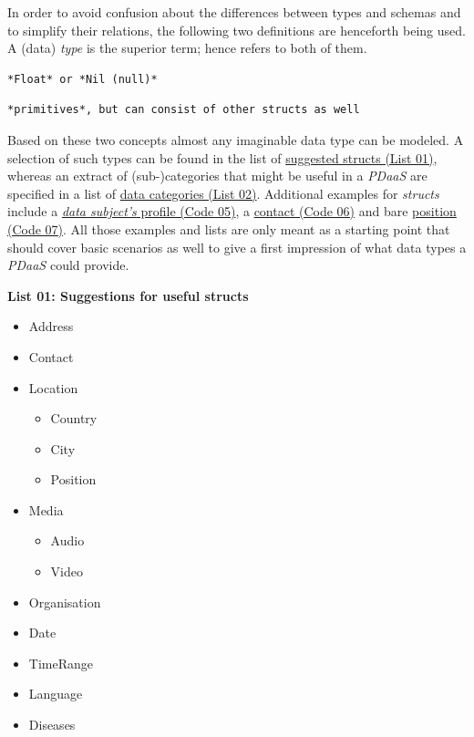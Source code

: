\documentclass[12pt,english,a4paper,titlepage,cleardoublepage=empty,dottedtoc]{report}
\providecommand{\tightlist}{%
  \setlength{\itemsep}{0pt}\setlength{\parskip}{0pt}}
\begin{document}
In order to avoid confusion about the differences between types and
schemas and to simplify their relations, the following two definitions
are henceforth being used. A (data) \emph{type} is the superior term;
hence refers to both of them.

\begin{verbatim}
*Float* or *Nil (null)*
\end{verbatim}

\begin{verbatim}
*primitives*, but can consist of other structs as well
\end{verbatim}

Based on these two concepts almost any imaginable data type can be
modeled. A selection of such types can be found in the list of
\protect\hyperlink{list-01_suggested-structs}{suggested structs (List
01)}, whereas an extract of (sub-)categories that might be useful in a
\emph{PDaaS} are specified in a list of
\protect\hyperlink{list-02_data-categories}{data categories (List 02)}.
Additional examples for \emph{structs} include a
\protect\hyperlink{code-05_struct_profile}{\emph{data subject's} profile
(Code 05)}, a \protect\hyperlink{code-06_struct_contact}{contact (Code
06)} and bare \protect\hyperlink{code-07_struct_position}{position (Code
07)}. All those examples and lists are only meant as a starting point
that should cover basic scenarios as well to give a first impression of
what data types a \emph{PDaaS} could provide.

\textbf{\protect\hypertarget{list-01_suggested-structs}{}{List 01:
Suggestions for useful structs}}

\begin{itemize}
\tightlist
\item
  Address
\item
  Contact
\item
  Location

  \begin{itemize}
  \tightlist
  \item
    Country
  \item
    City
  \item
    Position
  \end{itemize}
\item
  Media

  \begin{itemize}
  \tightlist
  \item
    Audio
  \item
    Video
  \end{itemize}
\item
  Organisation
\item
  Date
\item
  TimeRange
\item
  Language
\item
  Diseases
\end{itemize}
\end{document}
